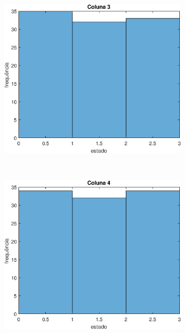 \documentclass[12pt]{article}
\newenvironment{exercise}[2][Exercício]{\begin{trivlist}
\item[\hskip \labelsep {\bfseries #1}\hskip \labelsep {\bfseries #2.}]}{\end{trivlist}}
\begin{document}
\begin{exercise}{1.d}
\begin{figure}[H]
    \centering
    \begin{subfigure}[b]{0.45\textwidth}
        \includegraphics[width=\textwidth]{figs/ex1_3.eps}
    \end{subfigure}
    ~ 
    \begin{subfigure}[b]{0.45\textwidth}
        \includegraphics[width=\textwidth]{figs/ex1_4.eps}
    \end{subfigure}
\end{figure}


\end{exercise}
\end{document}
